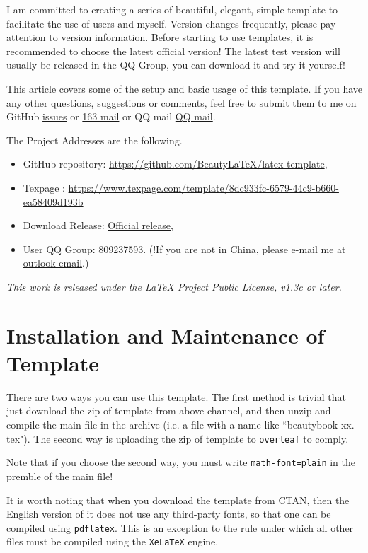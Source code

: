 \documentclass[lang=en,12pt]{beautybook}
\begin{document}
I am committed to creating a series of beautiful, elegant, simple template to facilitate the use of users and myself. Version changes frequently, please pay attention to version information. Before starting to use templates, it is recommended to choose the latest official version! The latest test version will usually be released in the QQ Group, you can download it and try it yourself!


This article covers some of the setup and basic usage of this template. If you have any other questions, suggestions or comments, feel free to submit them to me on GitHub
\href{https://github.com/BeautyLaTeX/latex-template/issues}{issues} or \href{h1479840692@163.com}{163 mail} or QQ mail \href{1479840692@qq.com}{QQ mail}. 


The Project Addresses are the following.
\begin{itemize}
  \item GitHub repository: \href{https://github.com/BeautyLaTeX/latex-template}{https://github.com/BeautyLaTeX/latex-template},
  \item Texpage : \href{https://www.texpage.com/template/8dc933fc-6579-44c9-b660-ea58409d193b}{https://www.texpage.com/template/8dc933fc-6579-44c9-b660-ea58409d193b}
  \item Download Release: \href{https://github.com/BeautyLaTeX/latex-template/releases}{Official release},
  \item User QQ Group: 809237593. (!If you are not in China, please e-mail me at \href{h1479840692@outlook.com}{outlook-email}.)
\end{itemize}

\textit{This work is released under the LaTeX Project Public License, v1.3c or later.}

\section{Installation and Maintenance of Template}

There are two ways you can use this template. The first method is trivial that just download the zip of template from above channel, and then unzip and compile the main file in the archive (i.e. a file with a name like ``beautybook-xx. tex"). The second way is uploading the zip of template to \texttt{overleaf} to comply.

Note that if you choose the second way,  you must write \lstinline{math-font=plain} in the premble of the main file!

It is worth noting that when you download the template from CTAN, then the English version of it does not use any third-party fonts, so that one can be compiled using \texttt{pdflatex}. This is an exception to the rule under which all other files must be compiled using the \texttt{XeLaTeX} engine.
\end{document}
